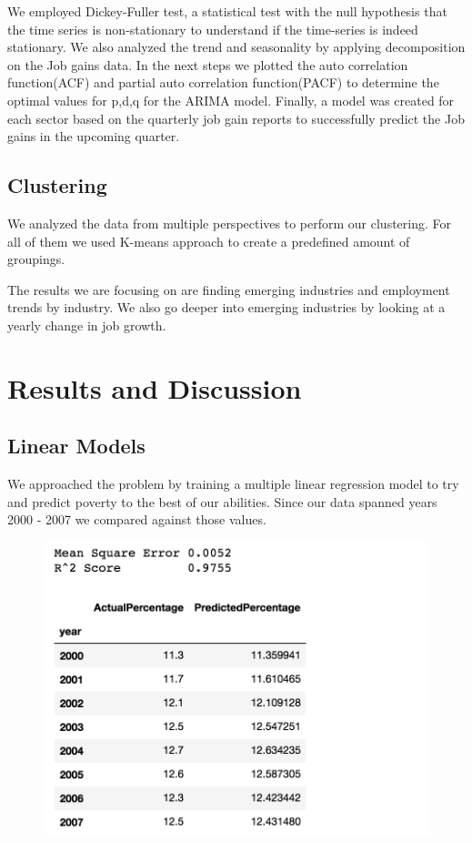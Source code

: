 \documentclass[11pt,letterpaper]{article}
\begin{document}
We employed Dickey-Fuller test, a statistical test with the null hypothesis that the time series is non-stationary to understand if the time-series is indeed stationary. We also analyzed the trend and seasonality by applying decomposition on the Job gains data. In the next steps we plotted the auto correlation function(ACF) and partial auto correlation function(PACF) to determine the optimal values for p,d,q for the ARIMA model. Finally, a model was created for each sector based on the quarterly job gain reports to successfully predict the Job gains in the upcoming quarter.

\subsection{Clustering}
\label{ssec:cluster}

We analyzed the data from multiple perspectives to perform our clustering. For all of them we used  K-means approach to create a predefined amount of groupings. 

The results we are focusing on are finding emerging industries and employment trends by industry. We also go deeper into emerging industries by looking at a yearly change in job growth.


\section{Results and Discussion}

\subsection{Linear Models}
\label{ssec:linearResults}
We approached the problem by training a multiple linear regression model to try and predict poverty to the best of our abilities. Since our data spanned years 2000 - 2007 we compared against those values. 

\begin{figure}[h]
	\includegraphics[width=\linewidth]{"./pictures/Mse_Score_Predictions"}
\end{figure}
\end{document}
